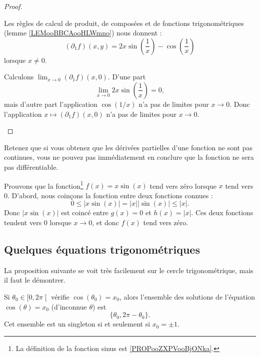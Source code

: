 \begin{proof}
\begin{subproof}
		\spitem[\( (\partial_1f)(x,y)\)]
		Les règles de calcul de produit, de composées et de fonctions trigonométriques (lemme \ref{LEMooBBCAooHLWmno}) nous donnent :
		\begin{equation}
			(\partial_1f)(x,y)=2x\sin\left( \frac{1}{ x} \right)-\cos\left( \frac{1}{ x} \right)
		\end{equation}
		lorsque \( x\neq 0\).

		Calculons \( \lim_{x\to 0}(\partial_1f)(x,0)\). D'une part
		\begin{equation}
			\lim_{x\to 0}2x\sin\left( \frac{1}{ x} \right)=0,
		\end{equation}
		mais d'autre part l'application \( \cos(1/x)\) n'a pas de limites pour \( x\to 0\). Donc l'application \( x\mapsto (\partial_1f)(x,0)\) n'a pas de limites pour \( x\to 0\).
	\end{subproof}
\end{proof}

Retenez que si vous obtenez que les dérivées partielles d'une fonction ne sont pas continues, vous ne pouvez pas immédiatement en conclure que la fonction ne sera pas différentiable.


\begin{example}     \label{EXooSPFDooSluUGV}
	Prouvons que la fonction\footnote{La définition de la fonction sinus est \ref{PROPooZXPVooBjONka}.} \( f(x)=x\sin(x)\) tend vers zéro lorsque \( x\) tend vers \( 0\). D'abord, nous coinçons la fonction entre deux fonctions connues :
	\begin{equation}
		0\leq| x\sin(x) |=| x | |\sin(x) |\leq | x |.
	\end{equation}
	Donc \( | x\sin(x) |\) est coincé entre \( g(x)=0\) et \( h(x)=| x |\). Ces deux fonctions tendent vers \( 0\) lorsque \( x\to 0\), et donc \( f(x)\) tend vers zéro.
\end{example}

\subsection{Quelques équations trigonométriques}

La proposition suivante se voit très facilement sur le cercle trigonométrique, mais il faut le démontrer.
\begin{proposition}     \label{PROPooTUUUooVrAGQo}
	Si \( \theta_0\in \mathopen[ 0 , 2\pi \mathclose[\) vérifie \( \cos(\theta_0)=x_0\), alors l'ensemble des solutions de l'équation \( \cos(\theta)=x_0\) (d'inconnue \( \theta\)) est
	\begin{equation}
		\{ \theta_0,2\pi-\theta_0 \}.
	\end{equation}
	Cet ensemble est un singleton si et seulement si \( x_0=\pm1\).
\end{proposition}

